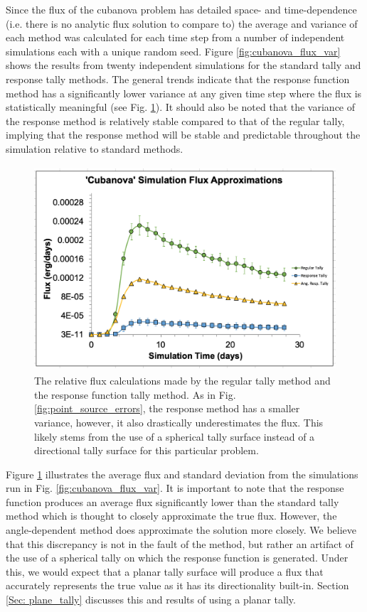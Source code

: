 Since the flux of the cubanova problem has detailed space- and time-dependence (i.e. there is no analytic flux solution to compare to) the average and variance of each method was calculated for each time step from a number of independent simulations each with a unique random seed. Figure \ref{fig:cubanova_flux_var} shows the results from twenty independent simulations for the standard tally and response tally methods. The general trends indicate that the response function method has a significantly lower variance at any given time step where the flux is statistically meaningful (see Fig. \ref{fig:cubanova_avg_error}). It should also be noted that the variance of the response method is relatively stable compared to that of the regular tally, implying that the response method will be stable and predictable throughout the simulation relative to standard methods. 

\begin{figure} [h!]
	\centering
	\includegraphics[height=3in]{VarReduction/plots/cubanova_avg_error.png}
	\caption{The relative flux calculations made by the regular tally method and the response function tally method. As in Fig. \ref{fig:point_source_errors}, the response method has a smaller variance, however, it also drastically underestimates the flux. This likely stems from the use of a spherical tally surface instead of a directional tally surface for this particular problem.}
	\label{fig:cubanova_avg_error}
\end{figure}

Figure \ref{fig:cubanova_avg_error} illustrates the average flux and standard deviation from the simulations run in Fig. \ref{fig:cubanova_flux_var}. It is important to note that the response function produces an average flux significantly lower than the standard tally method which is thought to closely approximate the true flux. However, the angle-dependent method does approximate the solution more closely. We believe that this discrepancy is not in the fault of the method, but rather an artifact of the use of a spherical tally on which the response function is generated. Under this, we would expect that a planar tally surface will produce a flux that accurately represents the true value as it has its directionality built-in. Section \ref{Sec: plane_tally} discusses this and results of using a planar tally.

